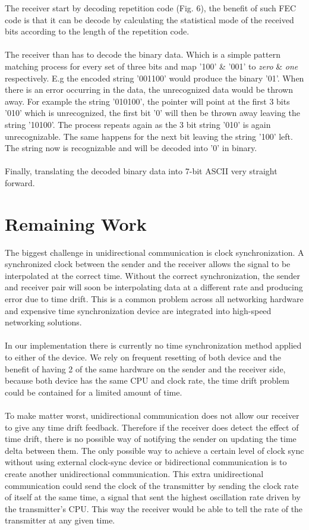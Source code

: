\documentclass[letterpaper, 10 pt, conference]{ieeeconf}  %
\begin{document}
The receiver start by decoding repetition code (Fig. 6), the benefit of such FEC code is that it can be decode by calculating the statistical mode of the received bits according to the length of the repetition code. 
\\ \\
The receiver than has to decode the binary data. Which is a simple pattern matching process for every set of three bits and map '100' \& '001' to \textit{zero} \& \textit{one} respectively. E.g the encoded string '001100' would produce the binary '01'. When there is an error occurring in the data, the unrecognized data would be thrown away. For example the string '010100', the pointer will point at the first 3 bits '010' which is unrecognized, the first bit '0' will then be thrown away leaving the string '10100'. The process repeats again as the 3 bit string '010' is again unrecognizable. The same happens for the next bit leaving the string '100' left. The string now is recognizable and will be decoded into '0' in binary.
\\ \\
Finally, translating the decoded binary data into 7-bit ASCII very straight forward.




\section{Remaining Work}

The biggest challenge in unidirectional communication is clock synchronization. A synchronized clock between the sender and the receiver allows the signal to be interpolated at the correct time. Without the correct synchronization, the sender and receiver pair will soon be interpolating data at a different rate and producing error due to time drift. This is a common problem across all networking hardware and expensive time synchronization device are integrated into high-speed networking solutions.
\\ \\
In our implementation there is currently no time synchronization method applied to either of the device. We rely on frequent resetting of both device and the benefit of having 2 of the same hardware on the sender and the receiver side, because both device has the same CPU and clock rate, the time drift problem could be contained for a limited amount of time.
\\ \\
To make matter worst, unidirectional communication does not allow our receiver to give any time drift feedback. Therefore if the receiver does detect the effect of time drift, there is no possible way of notifying the sender on updating the time delta between them. The only possible way to achieve a certain level of clock sync without using external clock-sync device or bidirectional communication is to create another unidirectional communication. This extra unidirectional communication could send the clock of the transmitter by sending the clock rate of itself at the same time, a signal that sent the highest oscillation rate driven by the transmitter's CPU. This way the receiver would be able to tell the rate of the transmitter at any given time. 
\end{document}
